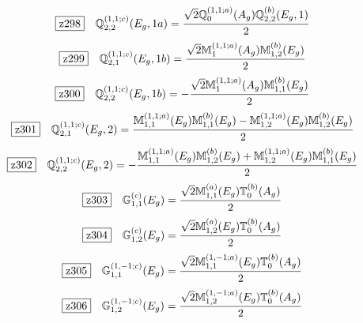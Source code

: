 \documentclass[fleqn,10pt,landscape]{jsarticle}
\begin{document}
\begin{dmath*}
\hspace*{3mm}\fbox{z298}\quad \mathbb{Q}_{2,2}^{(1,1;c)}(E_{g},1a)=\frac{\sqrt{2} \mathbb{Q}_{0}^{(1,1;a)}(A_{g}) \mathbb{Q}_{2,2}^{(b)}(E_{g},1)}{2}
\end{dmath*}
\begin{dmath*}
\hspace*{3mm}\fbox{z299}\quad \mathbb{Q}_{2,1}^{(1,1;c)}(E_{g},1b)=\frac{\sqrt{2} \mathbb{M}_{1}^{(1,1;a)}(A_{g}) \mathbb{M}_{1,2}^{(b)}(E_{g})}{2}
\end{dmath*}
\begin{dmath*}
\hspace*{3mm}\fbox{z300}\quad \mathbb{Q}_{2,2}^{(1,1;c)}(E_{g},1b)=- \frac{\sqrt{2} \mathbb{M}_{1}^{(1,1;a)}(A_{g}) \mathbb{M}_{1,1}^{(b)}(E_{g})}{2}
\end{dmath*}
\begin{dmath*}
\hspace*{3mm}\fbox{z301}\quad \mathbb{Q}_{2,1}^{(1,1;c)}(E_{g},2)=\frac{\mathbb{M}_{1,1}^{(1,1;a)}(E_{g}) \mathbb{M}_{1,1}^{(b)}(E_{g}) - \mathbb{M}_{1,2}^{(1,1;a)}(E_{g}) \mathbb{M}_{1,2}^{(b)}(E_{g})}{2}
\end{dmath*}
\begin{dmath*}
\hspace*{3mm}\fbox{z302}\quad \mathbb{Q}_{2,2}^{(1,1;c)}(E_{g},2)=- \frac{\mathbb{M}_{1,1}^{(1,1;a)}(E_{g}) \mathbb{M}_{1,2}^{(b)}(E_{g}) + \mathbb{M}_{1,2}^{(1,1;a)}(E_{g}) \mathbb{M}_{1,1}^{(b)}(E_{g})}{2}
\end{dmath*}
\begin{dmath*}
\hspace*{3mm}\fbox{z303}\quad \mathbb{G}_{1,1}^{(c)}(E_{g})=\frac{\sqrt{2} \mathbb{M}_{1,1}^{(a)}(E_{g}) \mathbb{T}_{0}^{(b)}(A_{g})}{2}
\end{dmath*}
\begin{dmath*}
\hspace*{3mm}\fbox{z304}\quad \mathbb{G}_{1,2}^{(c)}(E_{g})=\frac{\sqrt{2} \mathbb{M}_{1,2}^{(a)}(E_{g}) \mathbb{T}_{0}^{(b)}(A_{g})}{2}
\end{dmath*}
\begin{dmath*}
\hspace*{3mm}\fbox{z305}\quad \mathbb{G}_{1,1}^{(1,-1;c)}(E_{g})=\frac{\sqrt{2} \mathbb{M}_{1,1}^{(1,-1;a)}(E_{g}) \mathbb{T}_{0}^{(b)}(A_{g})}{2}
\end{dmath*}
\begin{dmath*}
\hspace*{3mm}\fbox{z306}\quad \mathbb{G}_{1,2}^{(1,-1;c)}(E_{g})=\frac{\sqrt{2} \mathbb{M}_{1,2}^{(1,-1;a)}(E_{g}) \mathbb{T}_{0}^{(b)}(A_{g})}{2}
\end{dmath*}
\end{document}
